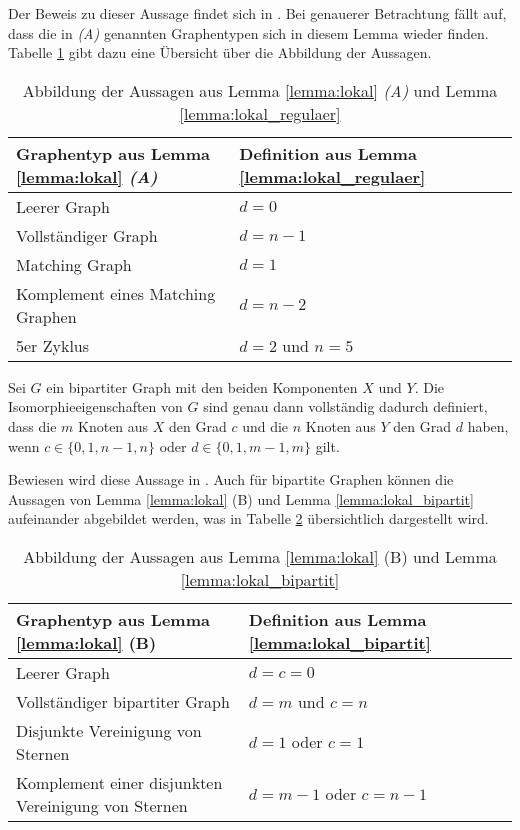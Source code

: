 Der Beweis zu dieser Aussage findet sich in \cite{johnson1975simple}.
Bei genauerer Betrachtung fällt auf, dass die in \emph{(A)} genannten Graphentypen sich in diesem Lemma wieder finden. Tabelle \ref{tab:mapping_regulaer} gibt dazu eine Übersicht über die Abbildung der Aussagen.

\begin{table}
	\centering
	\caption{Abbildung der Aussagen aus Lemma \ref{lemma:lokal} \emph{(A)} und Lemma \ref{lemma:lokal_regulaer}}
	\label{tab:mapping_regulaer}
	\begin{tabular}{|l|l|}
		\hline 
		Graphentyp aus Lemma \ref{lemma:lokal} \emph{(A)} & Definition aus Lemma \ref{lemma:lokal_regulaer} \\ 
		\hline 
		Leerer Graph & $d=0$ \\ 
		\hline 
		Vollständiger Graph & $d=n-1$ \\ 
		\hline 
		Matching Graph & $d=1$ \\ 
		\hline 
		Komplement eines Matching Graphen & $d=n-2$ \\ 
		\hline 
		5er Zyklus & $d=2$ und $n=5$ \\ 
		\hline 
	\end{tabular}
\end{table}

\begin{Lemma}
	Sei $G$ ein bipartiter Graph mit den beiden Komponenten $X$ und $Y$. 
	Die Isomorphieeigenschaften von $G$ sind genau dann vollständig dadurch definiert, dass die $m$ Knoten aus $X$ den Grad $c$ und die $n$ Knoten aus $Y$ den Grad $d$ haben, wenn $c\in \{0,1,n-1,n\}$ oder $d\in \{0,1,m-1,m\}$ gilt.
	\label{lemma:lokal_bipartit}
\end{Lemma}

Bewiesen wird diese Aussage in \cite{koren1976pairs}.
Auch für bipartite Graphen können die Aussagen von Lemma \ref{lemma:lokal} (B) und Lemma \ref{lemma:lokal_bipartit} aufeinander abgebildet werden, was in Tabelle \ref{tab:mapping_bipartit} übersichtlich dargestellt wird. \\

\begin{table}
	\centering
	\caption{Abbildung der Aussagen aus Lemma \ref{lemma:lokal} (B) und Lemma \ref{lemma:lokal_bipartit}}
	\label{tab:mapping_bipartit}
	\begin{tabular}{|l|l|}
		\hline 
		Graphentyp aus Lemma \ref{lemma:lokal} (B) & Definition aus Lemma \ref{lemma:lokal_bipartit} \\ 
		\hline 
		Leerer Graph & $d=c=0$ \\ 
		\hline 
		Vollständiger bipartiter Graph & $d=m$ und $c=n$ \\ 
		\hline 
		Disjunkte Vereinigung von Sternen & $d=1$ oder $c=1$ \\ 
		\hline 
		Komplement einer disjunkten Vereinigung von Sternen & $d=m-1$ oder $c=n-1$ \\ 
		\hline 
	\end{tabular} 
\end{table}

